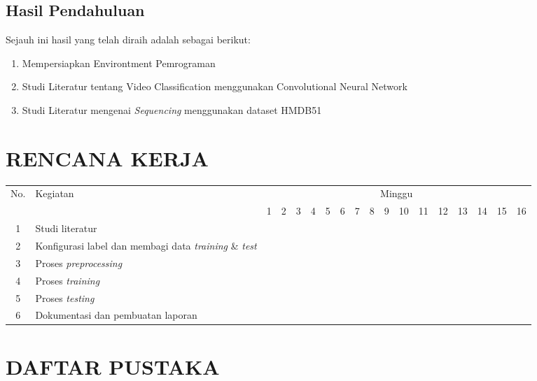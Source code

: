 \documentclass[a4paper]{article}
\begin{document}
	\subsection{Hasil Pendahuluan}
	Sejauh ini hasil yang telah diraih adalah sebagai berikut:
	\begin{enumerate}
		\item Mempersiapkan Environtment Pemrograman
		\item Studi Literatur tentang Video Classification menggunakan Convolutional Neural Network
		\item Studi Literatur mengenai \textit{Sequencing} menggunakan dataset HMDB51
	\end{enumerate}

	\section{RENCANA KERJA}
	\vspace{-5mm}
	\def\arraystretch{1.5}%
	\begin{table}[h!]
		\begin{tabular}{|c|p{3.5cm}|c|c|c|c|c|c|c|c|c|c|c|c|c|c|c|c|}
			\hline
			\multirow{2}{*}{No.} & \multirow{2}{*}{Kegiatan} & \multicolumn{16}{|c|}{Minggu} \\
			\cline{3-18} &&1&2&3&4&5&6&7&8&9&10&11&12&13&14&15&16 \\
			\hline
			1 & Studi literatur
			&\cellcolor{gray}
			&&&&&&&&&&&&&&& \\
			\hline
			2 & Konfigurasi label dan membagi data \textit{training} \& \textit{test} 
			&
			&\cellcolor{gray}&\cellcolor{gray}
			&&&&&&&&&&&&& \\
			\hline
			3 & Proses \textit{preprocessing} &&&
			&\cellcolor{gray}&\cellcolor{gray}
			&&&&&&&&&&& \\
			\hline
			4 & Proses \textit{training}
			&&&&&
			&\cellcolor{gray}&\cellcolor{gray}
			&\cellcolor{gray}&\cellcolor{gray}
			&\cellcolor{gray}&\cellcolor{gray}
			&\cellcolor{gray}&\cellcolor{gray}
			&&& \\
			\hline
			5 & Proses \textit{testing} 
			&&&&&&&&&&&&&
			&\cellcolor{gray}&\cellcolor{gray}
			&\cellcolor{gray}
			\\
			\hline
			6 & Dokumentasi dan pembuatan laporan  
			&\cellcolor{gray}&\cellcolor{gray}
			&\cellcolor{gray}&\cellcolor{gray}
			&\cellcolor{gray}&\cellcolor{gray}
			&\cellcolor{gray}&\cellcolor{gray}
			&\cellcolor{gray}&\cellcolor{gray}
			&\cellcolor{gray}&\cellcolor{gray}
			&\cellcolor{gray}&\cellcolor{gray}
			&\cellcolor{gray}&\cellcolor{gray} \\
			\hline
		\end{tabular}
	\end{table}

	\newpage
	\section{DAFTAR PUSTAKA}

	\nocite{*}
	
	
\end{document}
